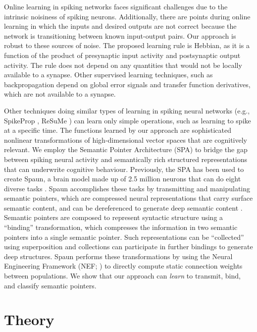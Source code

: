 \documentclass[10pt,letterpaper]{article}
\begin{document}
Online learning in spiking networks
faces significant challenges
due to the intrinsic noisiness of spiking neurons.
Additionally, there are points during online learning
in which the inputs and desired outputs
are not correct because the network
is transitioning between known input-output pairs.
Our approach is robust to these sources of noise.
The proposed learning rule is Hebbian,
as it is a function of the product of
presynaptic input activity and postsynaptic output activity.
The rule does not depend on any quantities that
would not be locally available
to a synapse.
Other supervised learning techniques,
such as backpropagation \cite{Rumelhart1986}
depend on global error signals
and transfer function derivatives,
which are not available to a synapse.

Other techniques doing similar types of learning
in spiking neural networks
(e.g., SpikeProp \cite{Bohte2002}, ReSuMe \cite{Ponulak2006a})
can learn only simple operations,
such as learning to spike at a specific time.
The functions learned by our approach are
sophisticated nonlinear transformations
of high-dimensional vector spaces that are
cognitively relevant.
We employ the Semantic Pointer Architecture (SPA)
to bridge the gap between spiking neural activity
and semantically rich structured representations
that can underwrite cognitive behaviour.
Previously, the SPA has been used to create Spaun,
a brain model made up of 2.5 million neurons
that can do eight diverse tasks \cite{Eliasmith2012}.
Spaun accomplishes these tasks by
transmitting and manipulating semantic pointers,
which are compressed neural representations
that carry surface semantic content,
and can be dereferenced to generate
deep semantic content \cite{EliasmithInPress}.
Semantic pointers are composed to represent syntactic structure
using a ``binding'' transformation,
which compresses the information in two semantic pointers
into a single semantic pointer.
Such representations can be ``collected''
using superposition and collections
can participate in further bindings to generate deep structures.
Spaun performs these transformations by using
the Neural Engineering Framework (NEF; )
to directly compute static connection weights between populations.
We show that our approach can \textit{learn} to transmit, bind,
and classify semantic pointers.

\section{Theory}
\end{document}
